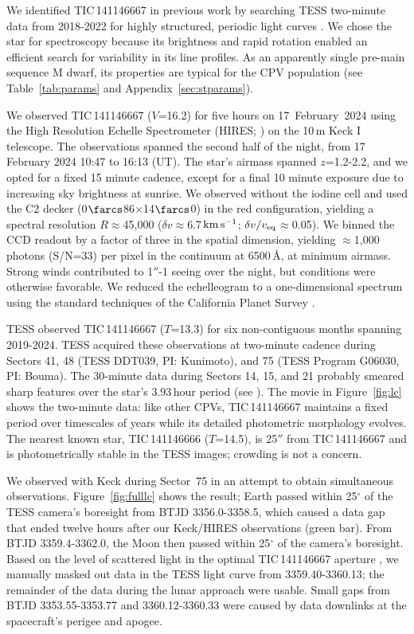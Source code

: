 \documentclass[11pt,twocolumn,tighten,linenumbers]{aastex7}
\newcommand{\kms}{\ensuremath{\rm km\,s^{-1}}}
\begin{document}
We identified TIC\,141146667 in previous work \citep{Bouma2024} by
searching TESS two-minute data from 2018-2022 for highly
structured, periodic light curves \citep{Ricker2015}.  We chose the
star for spectroscopy because its brightness and rapid rotation enabled
an efficient search for variability in its line profiles.
As an apparently single pre-main sequence M dwarf, its properties are
typical for the CPV population (see Table~\ref{tab:params} and
Appendix~\ref{sec:stparams}).

We observed TIC\,141146667 ($V$=16.2) for five hours on
17~February~2024 using the High Resolution Echelle Spectrometer
(HIRES; \citealt{vogt_hires_1994}) on the 10\,m Keck I telescope.  The
observations spanned the second half of the night, from 17 February
2024 10:47 to 16:13 (UT).  The star's airmass spanned $z$=1.2-2.2, and
we opted for a fixed 15 minute cadence, except for a final 10 minute
exposure due to increasing sky brightness at sunrise.  We observed
without the iodine cell and used the C2 decker
(0$\farcs$86$\times$14$\farcs$0) in the red configuration, yielding a
spectral resolution $R$$\approx$45{,}000 ($\delta
v$$\approx$6.7\,\kms; $\delta v / v_{\rm eq}$$\approx$0.05).  We
binned the CCD readout by a factor of three in the spatial dimension,
yielding $\approx$1,000 photons (S/N=33) per pixel in the continuum at
6500\,\AA, at minimum airmass.  Strong winds contributed to
1$''$-1 seeing over the night, but conditions were otherwise
favorable.  We reduced the echelleogram to a one-dimensional spectrum
using the standard techniques of the California Planet Survey
\citep{Howard2010}.  

TESS observed TIC\,141146667 ($T$=13.3) for six non-contiguous months
spanning 2019-2024.  TESS acquired these observations at two-minute
cadence during Sectors 41, 48 (TESS DDT039, PI: Kunimoto), and 75
(TESS Program G06030, PI: Bouma).   The 30-minute data during Sectors
14, 15, and 21 probably smeared sharp features over the star's 3.93\,hour
period (see \citealt{Gunther2022}).  The movie in
Figure~\ref{fig:lc} shows the two-minute data: 
like other CPVs, TIC\,141146667 maintains a fixed period over
timescales of years while its detailed photometric morphology evolves.
The nearest known star, TIC\,141146666 ($T$=14.5), is 25$''$ from
TIC\,141146667 and is photometrically stable in the TESS images;
crowding is not a concern.


We observed with Keck during Sector~75 in an attempt to obtain
simultaneous observations.   Figure~\ref{fig:fulllc} shows the result;
Earth passed within 25$^\circ$ of the TESS camera's boresight from BTJD
3356.0-3358.5, which caused a data gap that ended twelve hours after our
Keck/HIRES observations (green bar).  From BTJD 3359.4-3362.0, the Moon
then passed within 25$^\circ$ of the camera's boresight.  Based on the
level of scattered light in the optimal TIC\,141146667 aperture
\citep{Jenkins2016}, we manually masked out data in the TESS light curve
from 3359.40-3360.13; the remainder of the data during the lunar
approach were usable.  Small gaps from BTJD 3353.55-3353.77 and
3360.12-3360.33 were caused by data downlinks at the spacecraft's
perigee and apogee.
\end{document}
